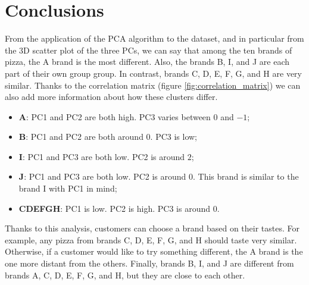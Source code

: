 \documentclass[../main.tex]{subfiles}
\begin{document}
\chapter{Conclusions}
From the application of the PCA algorithm to the dataset, and in particular from the 3D scatter plot of the three PCs, we can say that among the ten brands of pizza, the A brand is the most different. Also, the brands B, I, and J are each part of their own group group. In contrast, brands C, D, E, F, G, and H are very similar. Thanks to the correlation matrix (figure \ref{fig:correlation_matrix}) we can also add more information about how these clusters differ.
\begin{itemize}
    \item \textbf{A}: PC1 and PC2 are both high. PC3 varies between $0$ and $-1$;
    \item \textbf{B}: PC1 and PC2 are both around $0$. PC3 is low;
    \item \textbf{I}: PC1 and PC3 are both low. PC2 is around $2$;
    \item \textbf{J}: PC1 and PC3 are both low. PC2 is around $0$. This brand is similar to the brand I with PC1 in mind;
    \item \textbf{CDEFGH}: PC1 is low. PC2 is high. PC3 is around $0$.
\end{itemize}

Thanks to this analysis, customers can choose a brand based on their tastes. For example, any pizza from brands C, D, E, F, G, and H should taste very similar. Otherwise, if a customer would like to try something different, the A brand is the one more distant from the others. Finally, brands B, I, and J are different from brands A, C, D, E, F, G, and H, but they are close to each other.
\end{document}
